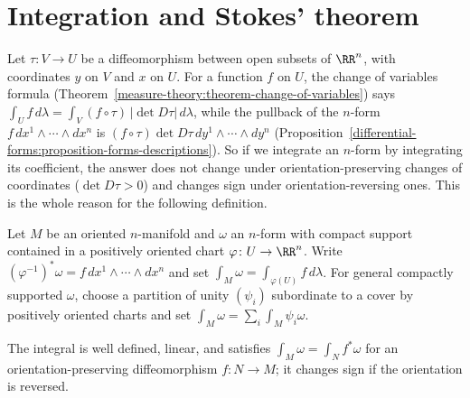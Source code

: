 \section{Integration and Stokes' theorem}\label{differential-forms:section-integration}

Let $\tau \colon V \to U$ be a diffeomorphism between open subsets of $\RR^n$, with coordinates $y$ on $V$ and $x$ on $U$. For a function $f$ on $U$, the change of variables formula
(Theorem~\ref{measure-theory:theorem-change-of-variables}) says $\int_Uf\,d\lambda = \int_V(f \circ \tau)\,|\det D\tau|\,d\lambda$, while the pullback of the $n$-form $f\,dx^1 \wedge \cdots \wedge dx^n$
is $(f \circ \tau)\det D\tau\,dy^1 \wedge \cdots \wedge dy^n$ (Proposition~\ref{differential-forms:proposition-forms-descriptions}). So if we integrate an $n$-form by integrating its coefficient,
the answer does not change under orientation-preserving changes of coordinates ($\det D\tau > 0$) and changes sign under orientation-reversing ones. This is the whole reason for
the following definition.

\begin{definition}\label{differential-forms:definition-integral}
Let $M$ be an oriented $n$-manifold and $\omega$ an $n$-form with compact support contained in a positively oriented chart $\varphi \colon U \to \RR^n$. Write $(\varphi^{-1})^*\omega = f\,dx^1 \wedge \cdots \wedge dx^n$
and set $\int_M\omega = \int_{\varphi(U)}f\,d\lambda$. For general compactly supported $\omega$, choose a partition of unity $(\psi_i)$ subordinate to a cover by positively oriented charts and set
$\int_M\omega = \sum_i\int_M\psi_i\omega$.
\end{definition}

\begin{proposition}\label{differential-forms:proposition-integral-well-defined}
The integral is well defined, linear, and satisfies $\int_M\omega = \int_N f^*\omega$ for an orientation-preserving diffeomorphism $f \colon N \to M$; it changes sign if the orientation is reversed.
\end{proposition}

